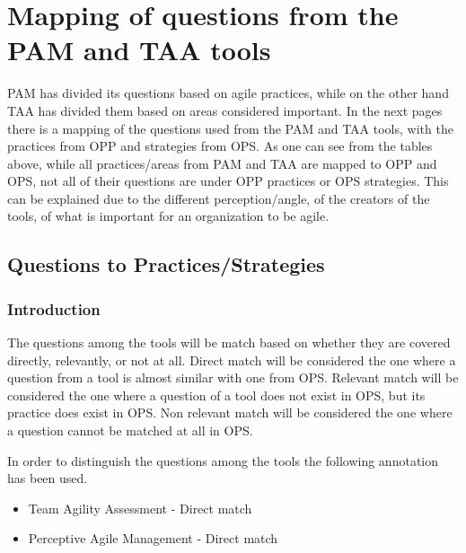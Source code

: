 \label{table:opp_taa_practices}


\section{Mapping of questions from the PAM and TAA tools}
\label{mapping}

PAM has divided its questions based on agile practices, while on the other hand TAA has divided them based on areas considered important. In the next pages there is a mapping of the questions used from the PAM and TAA tools, with the practices from OPP and strategies from OPS. As one can see from the tables above, while all practices/areas from PAM and TAA are mapped to OPP and OPS, not all of their questions are under OPP practices or OPS strategies. This can be explained due to the different perception/angle, of the creators of the tools, of what is important for an organization to be agile.





\subsection{Questions to Practices/Strategies}

\subsubsection{Introduction}
The questions among the tools will be match based on whether they are covered directly, relevantly, or not at all. Direct match will be considered the one where a question from a tool is almost similar with one from OPS. Relevant match will be considered the one where a question of a tool does not exist in OPS, but its practice does exist in OPS. Non relevant match will be considered the one where a question cannot be matched at all in OPS. 

\newcommand*\taa{\item[\DiamondSolid]}
\newcommand*\pam{\item[\OrnamentDiamondSolid]}

In order to distinguish the questions among the tools the following annotation has been used. 
\begin{itemize}
  \taa Team Agility Assessment - Direct match
  \pam Perceptive Agile Management - Direct match
\end{itemize}

